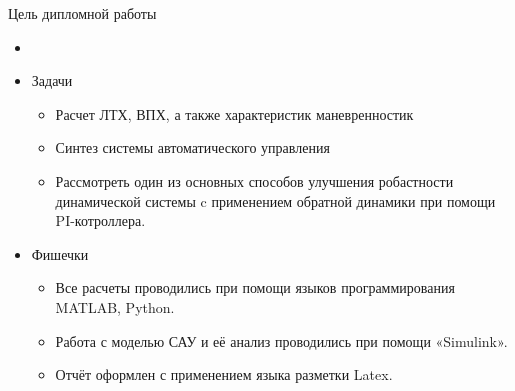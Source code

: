 \begin{frame}{Цель дипломной работы}
\begin{itemize}
    \item <+-> []
    \item <+-> [] \begin{block}{Задачи}
        \begin{itemize}
        \item Расчет ЛТХ, ВПХ, а также характеристик маневренностик
        \item Синтез системы автоматического управления
        \item Рассмотреть один из основных способов улучшения робастности динамической 
        системы c применением обратной динамики при помощи PI-котроллера.
        \end{itemize}
    \end{block}
    \item  <+-> [] \begin{block}{Фишечки} 
        \begin{itemize}
        \item Все расчеты проводились при помощи языков программирования MATLAB, Python.
        \item Работа с моделью САУ и её анализ проводились при помощи «Simulink». 
        \item Отчёт оформлен с применением языка разметки Latex. 
        \end{itemize}
    \end{block}
\end{itemize}    
\end{frame}